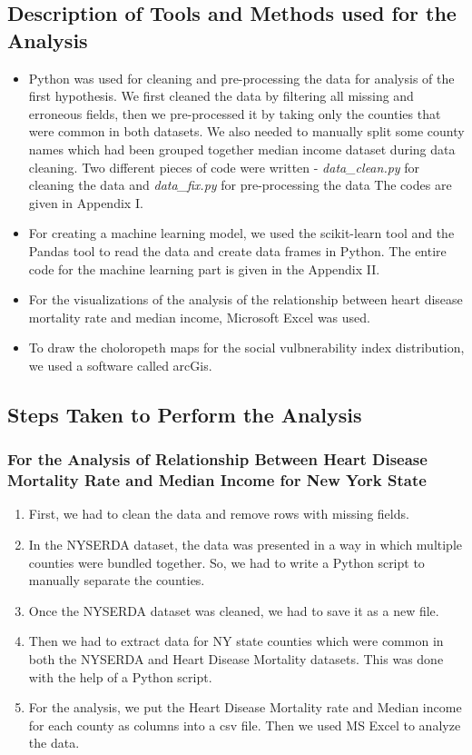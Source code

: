 \documentclass[journal,12pt,onecolumn]{IEEEtran}
\begin{document}
\subsection{Description of Tools and Methods used for the Analysis}
\begin{itemize}
\item Python was used for cleaning and pre-processing the data for analysis of the first hypothesis.
We first cleaned the data by filtering all missing and erroneous fields, then we pre-processed it by taking only the counties that were common in both datasets.
We also needed to manually split some county names which had been grouped together median income dataset during data cleaning.
Two different pieces of code were written - \emph{data\_clean.py} for cleaning the data and \emph{data\_fix.py} for pre-processing the data
The codes are given in Appendix I.

\item For creating a machine learning model, we used the scikit-learn tool and the Pandas tool to read the data and create data frames in Python.
The entire code for the machine learning part is given in the Appendix II.

\item For the visualizations of the analysis of the relationship between heart disease mortality rate and median income, Microsoft Excel was used.

\item To draw the choloropeth maps for the social vulbnerability index distribution, we used a software called arcGis.
\end{itemize}


\subsection{Steps Taken to Perform the Analysis}

\subsubsection{For the Analysis of Relationship Between Heart Disease Mortality Rate and Median Income for New York State}
\begin{enumerate}
\item First, we had to clean the data and remove rows with missing fields.
\item In the NYSERDA dataset, the data was presented in a way in which multiple counties were bundled together.
So, we had to write a Python script to manually separate the counties.
\item Once the  NYSERDA dataset was cleaned, we had to save it as a new file.
\item Then we had to extract data for NY state counties which were common in both the NYSERDA and Heart Disease Mortality datasets.
This was done with the help of a Python script.
\item For the analysis, we put the Heart Disease Mortality rate and Median income for each county as columns into a csv file.
Then we used MS Excel to analyze the data.
\end{enumerate}
\end{document}
